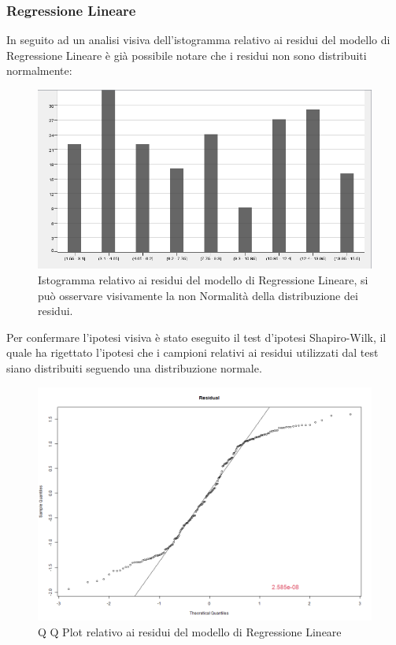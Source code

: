 \documentclass[12pt, a4paper, twocolumn]{article} %
\begin{document}
\subsubsection{Regressione Lineare}
In seguito ad un analisi visiva dell'istogramma relativo ai residui del modello di Regressione Lineare è già possibile notare che i residui non sono distribuiti normalmente:
\begin{figure}[H]
  \includegraphics[scale=0.45]{./Immagini/hist-linear-regression.png}
  \caption{Istogramma relativo ai residui del modello di Regressione Lineare, si può osservare visivamente la non Normalità della distribuzione dei residui.}
\end{figure}
Per confermare l'ipotesi visiva è stato eseguito il test d'ipotesi Shapiro-Wilk, il quale ha rigettato l'ipotesi che i campioni relativi ai residui utilizzati dal test siano distribuiti seguendo una distribuzione normale.
\begin{figure}[H]
  \includegraphics[scale=0.25]{./Immagini/qq-plot-linear-regression.png}
  \caption{Q Q Plot relativo ai residui del modello di Regressione Lineare}
\end{figure}
\end{document}

